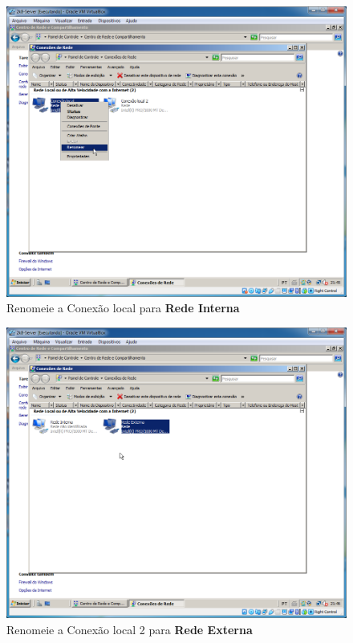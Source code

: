 \documentclass[10pt]{article}
\begin{document}
\begin{figure}[H]
    \centering
    \caption{Renomeie a Conexão local para \textbf{Rede Interna}}
    \label{fig:re024}
    \includegraphics[width=\linewidth]{images/rede_externa/re024.png}
\end{figure}
\begin{figure}[H]
    \centering
    \caption{Renomeie a Conexão local 2 para \textbf{Rede Externa}}
    \label{fig:re027}
    \includegraphics[width=\linewidth]{images/rede_externa/re027.png}
\end{figure}
\end{document}
